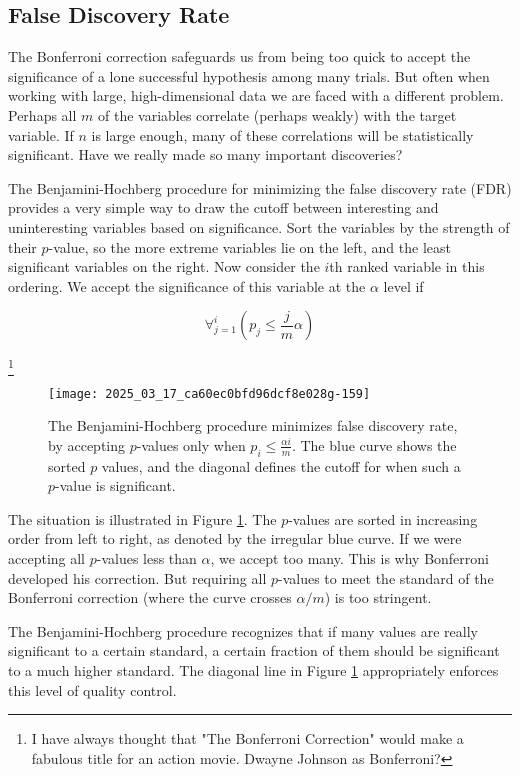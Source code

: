 \documentclass[10pt]{article}
\begin{document}
\subsection{False Discovery Rate}

The Bonferroni correction safeguards us from being too quick to accept the significance of a lone successful hypothesis among many trials. But often when working with large, high-dimensional data we are faced with a different problem. Perhaps all $m$ of the variables correlate (perhaps weakly) with the target variable. If $n$ is large enough, many of these correlations will be statistically significant. Have we really made so many important discoveries?

The Benjamini-Hochberg procedure for minimizing the false discovery rate (FDR) provides a very simple way to draw the cutoff between interesting and uninteresting variables based on significance. Sort the variables by the strength of their $p$-value, so the more extreme variables lie on the left, and the least significant variables on the right. Now consider the $i$th ranked variable in this ordering. We accept the significance of this variable at the $\alpha$ level if

\[
\forall_{j=1}^{i}\left(p_{j} \leq \frac{j}{m} \alpha\right)
\]

\footnote{I have always thought that "The Bonferroni Correction" would make a fabulous title for an action movie. Dwayne Johnson as Bonferroni?}

\begin{figure}[ht]
    \centering
    \texttt{[image: 2025\_03\_17\_ca60ec0bfd96dcf8e028g-159]}
    \caption{The Benjamini-Hochberg procedure minimizes false discovery rate, by accepting $p$-values only when $p_{i} \leq \frac{\alpha i}{m}$. The blue curve shows the sorted $p$ values, and the diagonal defines the cutoff for when such a $p$-value is significant.}
    \label{fig:benjamini-hochberg}
\end{figure}

The situation is illustrated in Figure \ref{fig:benjamini-hochberg}. The $p$-values are sorted in increasing order from left to right, as denoted by the irregular blue curve. If we were accepting all $p$-values less than $\alpha$, we accept too many. This is why Bonferroni developed his correction. But requiring all $p$-values to meet the standard of the Bonferroni correction (where the curve crosses $\alpha / m$) is too stringent.

The Benjamini-Hochberg procedure recognizes that if many values are really significant to a certain standard, a certain fraction of them should be significant to a much higher standard. The diagonal line in Figure \ref{fig:benjamini-hochberg} appropriately enforces this level of quality control.
\end{document}
